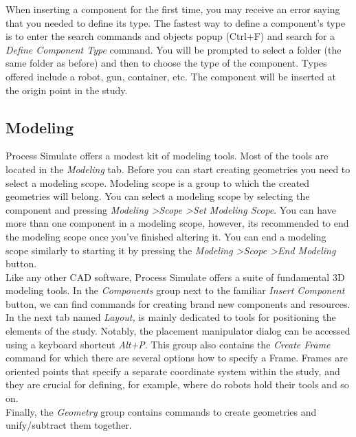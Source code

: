 When inserting a component for the first time, you may receive an error saying that you needed to define its type. 
The fastest way to define a component's type is to enter the search commands and objects popup (Ctrl+F) and search for a \emph{Define Component Type} command.
You will be prompted to select a folder (the same folder as before) and then to choose the type of the component. Types offered include a robot, gun, container, etc.
The component will be inserted at the origin point in the study. \\

\subsection{Modeling}
Process Simulate offers a modest kit of modeling tools. 
Most of the tools are located in the \emph{Modeling} tab.
Before you can start creating geometries you need to select a modeling scope.
Modeling scope is a group to which the created geometries will belong.
You can select a modeling scope by selecting the component and pressing \emph{Modeling \textgreater Scope \textgreater Set Modeling Scope}.
You can have more than one component in a modeling scope, however, its recommended to end the modeling scope once you've finished altering it.
You can end a modeling scope similarly to starting it by pressing the \emph{Modeling \textgreater Scope \textgreater End Modeling} button. \\

Like any other CAD software, Process Simulate offers a suite of fundamental 3D modeling tools.
In the \emph{Components} group next to the familiar \emph{Insert Component} button, we can find commands for creating brand new components and resources. \\

In the next tab named \emph{Layout,} is mainly dedicated to tools for positioning the elements of the study.
Notably, the placement manipulator dialog can be accessed using a keyboard shortcut \emph{Alt+P}.
This group also contains the \emph{Create Frame} command for which there are several options how to specify a Frame.
Frames are oriented points that specify a separate coordinate system within the study, and they are crucial for defining, for example, where do robots hold their tools and so on. \\

Finally, the \emph{Geometry} group contains commands to create geometries and unify/subtract them together. \\

